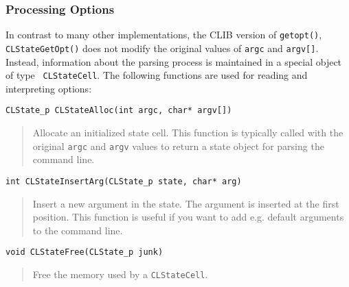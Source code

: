\subsubsection{Processing Options}

In contrast to many other implementations, the CLIB version of
\texttt{getopt()}, {\tt CLStateGetOpt()} does not modify the original
values of {\tt argc} and {\tt argv[]}. Instead, information about the
parsing process is maintained in a special object of type {\tt
  CLStateCell}. The following functions are used for reading and
interpreting options:

\begin{verbatim}
CLState_p CLStateAlloc(int argc, char* argv[])
\end{verbatim}
\begin{quote}
  Allocate an initialized state cell. This function is typically
  called with the original \texttt{argc} and \texttt{argv} values to
  return a state object for parsing the command line.
\end{quote}



\begin{verbatim}
int CLStateInsertArg(CLState_p state, char* arg)
\end{verbatim}
\begin{quote}
Insert a new argument in the state. The argument is inserted at the
first position. This function is useful if you want to add
e.g. default arguments to the command line.
\end{quote}

\begin{verbatim}
void CLStateFree(CLState_p junk)
\end{verbatim}
\begin{quote}
Free the memory used by a \texttt{CLStateCell}.
\end{quote}


